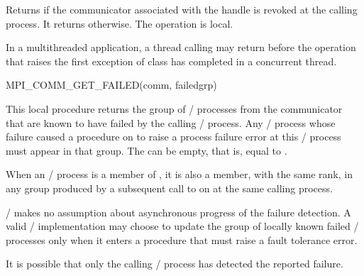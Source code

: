 \par
Returns  if the communicator associated with the handle  is revoked at the calling process. It returns  otherwise. The operation is local.

\begin{users}
    In a multithreaded application, a thread calling  may return  before the operation that raises the first exception of class  has completed in a concurrent thread.
\end{users}

\begin{funcdef}{MPI\_COMM\_GET\_FAILED}{(\mbox{comm}, \mbox{failedgrp})}
\end{funcdef}

\par
This local procedure returns the group  of \MPI/ processes from the
communicator  that are known to have failed by the calling \MPI/ process.
Any \MPI/ process whose failure caused a procedure on  to raise
a process failure error at this \MPI/ process must appear in that group.
The  can be empty, that is, equal to .

When an \MPI/ process is a member of , it is also a member,
with the same rank, in any group produced by a subsequent call to  on  at the same calling process.

\begin{users}
\MPI/ makes no assumption about asynchronous
progress of the failure detection. A valid \MPI/ implementation may choose
to update the group of locally known failed \MPI/ processes only when it enters
a procedure that must raise a fault tolerance error.

It is possible that only the calling \MPI/ process has
detected the reported failure.
\end{users}

